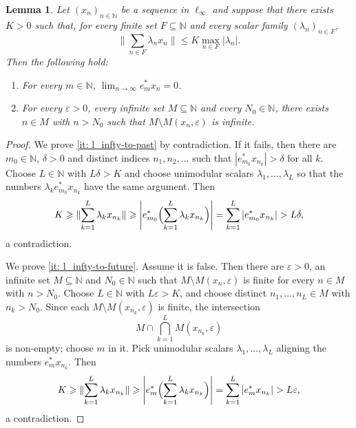 \documentclass[11pt]{amsart}
\theoremstyle{plain}
\newtheorem{lemma}[theorem]{Lemma}
\theoremstyle{definition}
\numberwithin{equation}{section}
\newcommand{\norm}[1]{\lVert #1 \rVert}
\newcommand{\N}{\mathbb{N}}
\renewcommand{\leq}{\leqslant}
\renewcommand{\geq}{\geqslant}
\begin{document}
\begin{lemma}\label{lmm: Lind-preliminary-1}
    Let $(x_n)_{n \in \N}$ be a sequence in $\ell_\infty$ and suppose that there exists $K > 0$ such that, for every finite set $F\subseteq\N$ and every scalar family $(\lambda_n)_{n\in F}$,
    \begin{equation*}
        \norm{\sum_{n\in F} \lambda_n x_n} \leq K \max_{n\in F} |\lambda_n|.
    \end{equation*}
    Then the following hold:
    \begin{enumerate}[label = (\alph*), ref = (\alph*)]
        \item \label{it: l_infty-to-past} For every $m \in \N$, $\lim_{n \to \infty} e^*_m x_n = 0$.
        \item \label{it: l_infty-to-future} For every $\varepsilon > 0$, every infinite set $M \subseteq \N$ and every $N_0 \in \N$, there exists $n \in M$ with $n>N_0$ such that $M \setminus M(x_n, \varepsilon)$ is infinite.
    \end{enumerate}
\end{lemma}
\begin{proof}
    We prove \ref{it: l_infty-to-past} by contradiction. If it fails, then there are $m_0\in\N$, $\delta>0$ and distinct indices $n_1,n_2,\dots$ such that $|e^*_{m_0}x_{n_k}|>\delta$ for all $k$. Choose $L\in\N$ with $L\delta>K$ and choose unimodular scalars $\lambda_1,\dots,\lambda_L$ so that the numbers $\lambda_k e^*_{m_0}x_{n_k}$ have the same argument. Then
    \begin{equation*}
        K \geq \norm{\sum_{k=1}^L \lambda_k x_{n_k}}
        \geq \left|e^*_{m_0}\Bigl(\sum_{k=1}^L \lambda_k x_{n_k}\Bigr)\right|
        =\sum_{k=1}^L |e^*_{m_0}x_{n_k}|
        >L\delta,
    \end{equation*}
    a contradiction.

    We prove \ref{it: l_infty-to-future}. Assume it is false. Then there are $\varepsilon>0$, an infinite set $M\subseteq\N$ and $N_0\in\N$ such that $M\setminus M(x_n,\varepsilon)$ is finite for every $n\in M$ with $n>N_0$. Choose $L\in\N$ with $L\varepsilon>K$, and choose distinct $n_1,\dots,n_L\in M$ with $n_k>N_0$. Since each $M\setminus M(x_{n_k},\varepsilon)$ is finite, the intersection
    \begin{equation*}
        M\cap\bigcap_{k=1}^L M(x_{n_k},\varepsilon)
    \end{equation*}
    is non-empty; choose $m$ in it. Pick unimodular scalars $\lambda_1,\dots,\lambda_L$ aligning the numbers $e_m^*x_{n_k}$. Then
    \begin{equation*}
        K \geq \norm{\sum_{k=1}^L \lambda_k x_{n_k}}
        \geq \left|e_m^*\Bigl(\sum_{k=1}^L \lambda_k x_{n_k}\Bigr)\right|
        =\sum_{k=1}^L |e_m^*x_{n_k}|
        >L\varepsilon,
    \end{equation*}
    a contradiction.
\end{proof}
\end{document}
